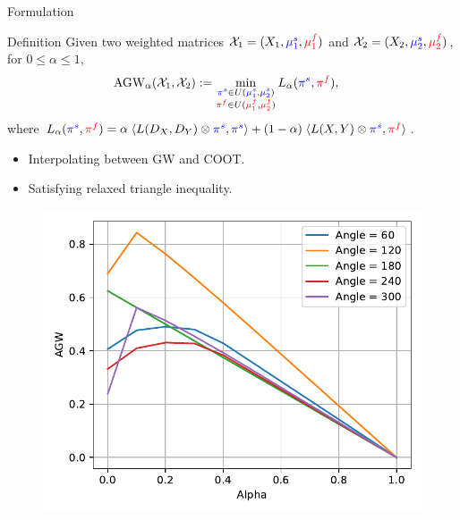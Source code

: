 \documentclass{beamer}
\newcommand{\agw}{\text{AGW}}
\newcommand{\cX}{\mathcal X}
\newcommand{\pis}{{\color{blue}{\pi^s}}}
\newcommand{\pif}{{\color{red}{\pi^f}}}
\newcommand{\mfsrc}{{\color{red}{\mu_1^f}}}
\newcommand{\mftg}{{\color{red}{\mu_2^f}}}
\newcommand{\mssrc}{{\color{blue}{\mu_1^s}}}
\newcommand{\mstg}{{\color{blue}{\mu_2^s}}}
\begin{document}
\begin{frame}{Formulation}
\tiny
\begin{block}{Definition}
  Given two weighted matrices $\cX_1 = (X_1, \mssrc, \mfsrc)$
  and $\cX_2 = (X_2, \mstg, \mftg)$, for $0\leq \alpha \leq 1$,
  \begin{align*}
    \label{eq:scootr}
    \agw_{\alpha}(\cX_1, \cX_2) &:=
    \min_{\substack{\pis \in U(\mssrc,\mstg) \\ \pif \in U(\mfsrc,\mftg)}}
    L_{\alpha}(\pis, \pif),
  \end{align*}
  where $L_{\alpha}(\pis, \pif) =
  \alpha \; \langle L(D_X,D_Y)\otimes \pis, \pis \rangle
  + (1-\alpha) \; \langle L(X,Y) \otimes \pis, \pif \rangle$.
\end{block}
\begin{minipage}[t]{0.6\linewidth}
  \begin{itemize}
    \item Interpolating between GW and COOT.
    \item Satisfying relaxed triangle inequality.
  \end{itemize}
  \end{minipage}%
  \hfill%
  \hspace{-6cm}
  \begin{minipage}[t]{0.5\linewidth}
    \vspace{-0.2cm}
  \begin{figure}
    \centering
    \includegraphics[width=0.85\linewidth, keepaspectratio=true]{OT_new/agw_alpha.pdf}
  \end{figure}
  \end{minipage}

\end{frame}
\end{document}

